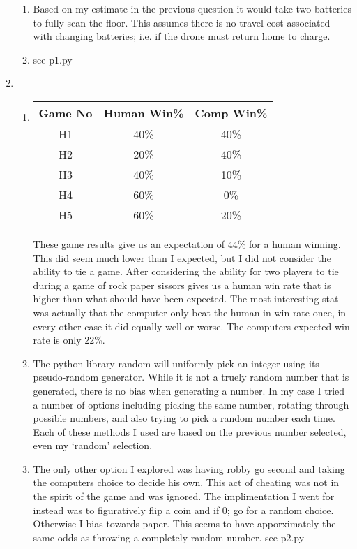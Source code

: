 \documentclass{article}
\begin{document}
\begin{enumerate}
\begin{enumerate}
    \item Based on my estimate in the previous question it would take two batteries to fully scan the floor.  This assumes there is no travel cost associated with changing batteries; i.e. if the drone must return home to charge.
    \item see p1.py
	\end{enumerate}
\item \begin{enumerate}
	\item 
		\begin{tabular}{|c|c|c|}
		\hline
		Game No & Human Win\% & Comp Win\% \\
		\hline \hline
		H1 & 40\% & 40\% \\
		H2 & 20\% & 40\% \\
		H3 & 40\% & 10\% \\
		H4 & 60\% & 0\% \\
		H5 & 60\% & 20\% \\
		\hline
		\end{tabular} \newline
		These game results give us an expectation of 44\% for a human winning.  This did seem much lower than I expected, but I did not consider the ability to tie a game. After considering the ability for two players to tie during a game of rock paper sissors gives us a human win rate that is higher than what should have been expected. The most interesting stat was actually that the computer only beat the human in win rate once, in every other case it did equally well or worse.  The computers expected win rate is only 22\%.  
	\item The python library random will uniformly pick an integer using its pseudo-random generator.  While it is not a truely random number that is generated, there is no bias when generating a number. In my case I tried a number of options including picking the same number, rotating through possible numbers, and also trying to pick a random number each time.  Each of these methods I used are based on the previous number selected, even my `random' selection.
	\item The only other option I explored was having robby go second and taking the computers choice to decide his own.  This act of cheating was not in the spirit of the game and was ignored. The implimentation I went for instead was to figuratively flip a coin and if 0; go for a random choice.  Otherwise I bias towards paper.  This seems to have apporximately the same odds as throwing a completely random number.  see p2.py
	\end{enumerate}
\end{enumerate}
\end{document}
